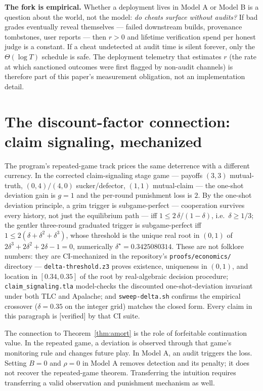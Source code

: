 \documentclass[11pt,a4paper]{article}
\begin{document}


\textbf{The fork is empirical.} Whether a deployment lives in Model A or Model B is a question about the world, not the model: \emph{do cheats surface without audits?} If bad grades eventually reveal themselves --- failed downstream builds, provenance tombstones, user reports --- then $r > 0$ and lifetime verification spend per honest judge is a constant. If a cheat undetected at audit time is silent forever, only the $\Theta(\log T)$ schedule is safe. The deployment telemetry that estimates $r$ (the rate at which sanctioned outcomes were first flagged by non-audit channels) is therefore part of this paper's measurement obligation, not an implementation detail.

\section{The discount-factor connection: claim signaling, mechanized}\label{sec:signaling}
The program's repeated-game track prices the same deterrence with a different currency. In the corrected claim-signaling stage game --- payoffs $(3,3)$ mutual-truth, $(0,4)/(4,0)$ sucker/defector, $(1,1)$ mutual-claim --- the one-shot deviation gain is $g = 1$ and the per-round punishment loss is $2$. By the one-shot deviation principle, a grim trigger is subgame-perfect --- cooperation survives every history, not just the equilibrium path --- iff $1 \le 2\,\delta/(1-\delta)$, i.e.\ $\delta \ge 1/3$; the gentler three-round graduated trigger is subgame-perfect iff $1 \le 2(\delta + \delta^2 + \delta^3)$, whose threshold is the unique real root in $(0,1)$ of $2\delta^3 + 2\delta^2 + 2\delta - 1 = 0$, numerically $\delta^\star = 0.3425080314$. These are not folklore numbers: they are CI-mechanized in the repository's \texttt{proofs/\allowbreak economics/\allowbreak } directory --- \texttt{delta-threshold.z3} proves existence, uniqueness in $(0,1)$, and location in $[0.34, 0.35]$ of the root by real-algebraic decision procedure; \texttt{claim\_\allowbreak signaling.tla} model-checks the discounted one-shot-deviation invariant under both TLC and Apalache; and \texttt{sweep-delta.sh} confirms the empirical crossover ($\delta = 0.35$ on the integer grid) matches the closed form. Every claim in this paragraph is [verified] by that CI suite.

The connection to Theorem~\ref{thm:amort} is the role of forfeitable continuation value. In the repeated game, a deviation is observed through that game's monitoring rule and changes future play. In Model A, an audit triggers the loss. Setting $B=0$ and $\rho=0$ in Model A removes detection and its penalty; it does not recover the repeated-game theorem. Transferring the intuition requires transferring a valid observation and punishment mechanism as well.
\end{document}
